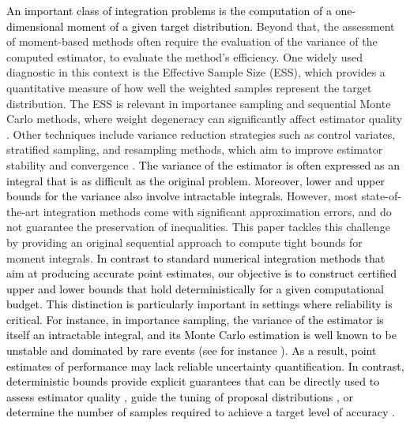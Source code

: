 \documentclass[review]{elsarticle}
\newcommand{\cblue}{\textcolor{black}}
\begin{document}
\cblue{An important class of integration problems is the computation of a one-dimensional moment of a given target distribution.} Beyond that, the assessment of moment-based methods often require the evaluation of the variance of the computed estimator, to evaluate the method's efficiency. One widely used diagnostic in this context is the Effective Sample Size (ESS), which provides a quantitative measure of how well the weighted samples represent the target distribution. The ESS is relevant in importance sampling and sequential Monte Carlo methods, where weight degeneracy can significantly affect estimator quality \cite{martino2017effective,elvira2022rethinking}. Other techniques include variance reduction strategies such as control variates, stratified sampling, and resampling methods, which aim to improve estimator stability and convergence \cite{owen2000safe,elvira2019generalized}. 
\cblue{The variance of the estimator is often expressed as an integral that is as difficult as the original problem. Moreover, lower and upper bounds for the variance also involve intractable integrals.} However, most state-of-the-art integration methods come with significant approximation errors, and do not guarantee the preservation of inequalities. This paper tackles this challenge by providing an original sequential approach to compute tight bounds for moment integrals. \cblue{In contrast to standard numerical integration methods that aim at producing accurate point estimates, our objective is to construct certified upper and lower bounds that hold deterministically for a given computational budget. This distinction is particularly important in settings where reliability is critical. For instance, in importance sampling, the variance of the estimator is itself an intractable integral, and its Monte Carlo estimation is well known to be unstable and dominated by rare events (see for instance \cite{koehler2009assessment,Owen13}). As a result, point estimates of performance may lack reliable uncertainty quantification. In contrast, deterministic bounds provide explicit guarantees that can be directly used to assess estimator quality \cite{agarwal2022principled}, guide the tuning of proposal distributions \cite{bugallo2017adaptive,elvira2022optimized}, or determine the number of samples required to achieve a target level of accuracy \cite{elvira2021performance}.}

\end{document}

